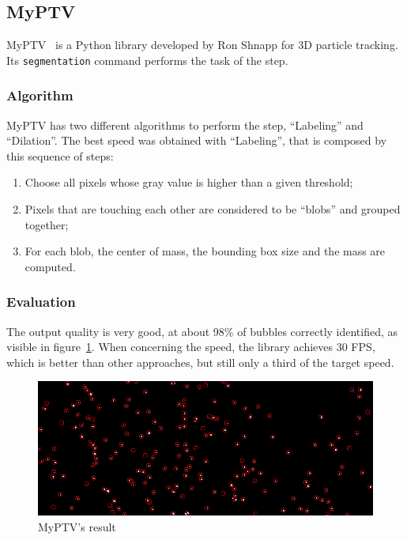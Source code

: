 \subsection{MyPTV}
\label{sec:locate:myptv}

MyPTV~\cite{myptv} is a Python library developed by Ron Shnapp for 3D particle tracking.
Its \texttt{segmentation} command performs the task of the \locate* step.

\subsubsection{Algorithm}

MyPTV has two different algorithms to perform the \locate* step, ``Labeling'' and ``Dilation''.
The best speed was obtained with ``Labeling'', that is composed by this sequence of steps:
\begin{enumerate}
	\itemsep 0em
	\item Choose all pixels whose gray value is higher than a given threshold;
	\item Pixels that are touching each other are considered to be ``blobs'' and grouped together;
	\item For each blob, the center of mass, the bounding box size and the mass are computed.
\end{enumerate}

\subsubsection{Evaluation}

The output quality is very good, at about 98\% of bubbles correctly identified, as visible in figure~\ref{fig:locate:myptv}.
When concerning the speed, the library achieves 30 FPS, which is better than other approaches, but still only a third of the target speed.

\begin{figure}
	\centerline{\includegraphics[width=\locateimgsize]{images/locate/myptv.png}}
	\caption{\centering MyPTV's result}
	\label{fig:locate:myptv}
\end{figure}
